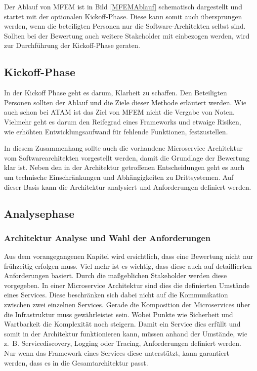 Der Ablauf von \ac{MFEM} ist in Bild \ref{MFEMAblauf} schematisch dargestellt und startet mit der optionalen Kickoff-Phase. Diese kann somit auch übersprungen werden, wenn die beteiligten Personen nur die Software-Architekten selbst sind. Sollten bei der Bewertung auch weitere Stakeholder mit einbezogen werden, wird zur Durchführung der Kickoff-Phase geraten.


\subsection{Kickoff-Phase}

In der Kickoff Phase geht es darum, Klarheit zu schaffen. Den Beteiligten Personen sollten der Ablauf und die Ziele dieser Methode erläutert werden. Wie auch schon bei \ac{ATAM} ist das Ziel von \ac{MFEM} nicht die Vergabe von Noten. Vielmehr geht es darum den Reifegrad eines Frameworks und etwaige Risiken, wie erhöhten Entwicklungsaufwand für fehlende Funktionen, festzustellen. 

In diesem Zusammenhang sollte auch die vorhandene Microservice Architektur vom Soft\-ware\-architekten vorgestellt werden, damit die Grundlage der Bewertung klar ist. Neben den in der Architektur getroffenen Entscheidungen geht es auch um technische Einschränkungen und Abhängigkeiten zu Drittsystemen. Auf dieser Basis kann die Architektur analysiert und Anforderungen definiert werden.

\subsection{Analysephase}


\subsubsection{Architektur Analyse und Wahl der Anforderungen}\label{Analyse_Wahl_Anforderungen}

Aus dem vorangegangenen Kapitel wird ersichtlich, dass eine Bewertung nicht nur frühzeitig erfolgen muss. Viel mehr ist es wichtig, dass diese auch auf detaillierten Anforderungen basiert. Durch die maßgeblichen Stakeholder werden diese vorgegeben. In einer Microservice Architektur sind dies die definierten Umstände eines Services. Diese beschränken sich dabei nicht auf die Kommunikation zwischen zwei einzelnen Services. Gerade die Komposition der Microservices über die Infrastruktur muss gewährleistet sein. Wobei Punkte wie Sicherheit und Wartbarkeit die Komplexität noch steigern.
Damit ein Service dies erfüllt und somit in der Architektur funktionieren kann, müssen anhand der Umstände, wie z.~B. Servicediscovery, Logging oder Tracing, Anforderungen definiert werden. Nur wenn das Framework eines Services diese unterstützt, kann garantiert werden, dass es in die Gesamtarchitektur passt.

